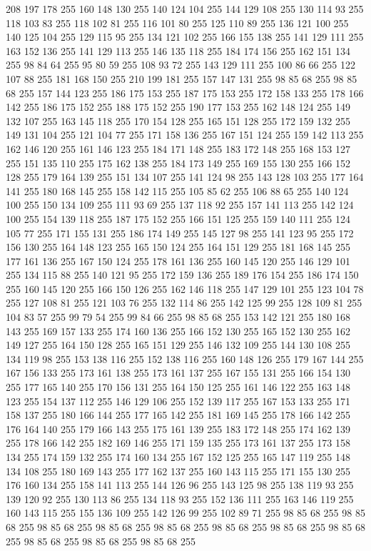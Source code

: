 208 197 178 255 160 148 130 255 140 124 104 255 144 129 108 255 130 114 93 255 118 103 83 255 118 102 81 255 116 101 80 255 125 110 89 255 136 121 100 255 140 125 104 255 129 115 95 255 134 121 102 255 166 155 138 255 141 129 111 255 163 152 136 255 141 129 113 255 146 135 118 255 184 174 156 255 162 151 134 255 98 84 64 255 95 80 59 255 108 93 72 255 143 129 111 255 100 86 66 255 122 107 88 255 181 168 150 255 210 199 181 255 157 147 131 255 98 85 68 255 98 85 68 255 157 144 123 255 186 175 153 255 187 175 153 255 172 158 133 255 178 166 142 255 186 175 152 255 188 175 152 255 190 177 153 255 162 148 124 255 149 132 107 255 163 145 118 255 170 154 128 255 165 151 128 255 172 159 132 255 149 131 104 255 121 104 77 255 171 158 136 255 167 151 124 255 159 142 113 255 162 146 120 255 161 146 123 255 184 171 148 255 183 172 148 255 168 153 127 255 151 135 110 255 175 162 138 255 184 173 149 255 169 155 130 255 166 152 128 255 179 164 139 255 151 134 107 255 141 124 98 255 143 128 103 255
177 164 141 255 180 168 145 255 158 142 115 255 105 85 62 255 106 88 65 255 140 124 100 255 150 134 109 255 111 93 69 255 137 118 92 255 157 141 113 255 142 124 100 255 154 139 118 255 187 175 152 255 166 151 125 255 159 140 111 255 124 105 77 255 171 155 131 255 186 174 149 255 145 127 98 255 141 123 95 255 172 156 130 255 164 148 123 255 165 150 124 255 164 151 129 255 181 168 145 255 177 161 136 255 167 150 124 255 178 161 136 255 160 145 120 255 146 129 101 255 134 115 88 255 140 121 95 255 172 159 136 255 189 176 154 255 186 174 150 255 160 145 120 255 166 150 126 255 162 146 118 255 147 129 101 255 123 104 78 255 127 108 81 255 121 103 76 255 132 114 86 255 142 125 99 255 128 109 81 255 104 83 57 255 99 79 54 255 99 84 66 255 98 85 68 255 153 142 121 255 180 168 143 255 169 157 133 255 174 160 136 255 166 152 130 255 165 152 130 255 162 149 127 255 164 150 128 255 165 151 129 255 146 132 109 255 144 130 108 255 134 119 98 255 153 138 116 255 152 138 116 255 160 148 126 255
179 167 144 255 167 156 133 255 173 161 138 255 173 161 137 255 167 155 131 255 166 154 130 255 177 165 140 255 170 156 131 255 164 150 125 255 161 146 122 255 163 148 123 255 154 137 112 255 146 129 106 255 152 139 117 255 167 153 133 255 171 158 137 255 180 166 144 255 177 165 142 255 181 169 145 255 178 166 142 255 176 164 140 255 179 166 143 255 175 161 139 255 183 172 148 255 174 162 139 255 178 166 142 255 182 169 146 255 171 159 135 255 173 161 137 255 173 158 134 255 174 159 132 255 174 160 134 255 167 152 125 255 165 147 119 255 148 134 108 255 180 169 143 255 177 162 137 255 160 143 115 255 171 155 130 255 176 160 134 255 158 141 113 255 144 126 96 255 143 125 98 255 138 119 93 255 139 120 92 255 130 113 86 255 134 118 93 255 152 136 111 255 163 146 119 255 160 143 115 255 155 136 109 255 142 126 99 255 102 89 71 255 98 85 68 255 98 85 68 255 98 85 68 255 98 85 68 255 98 85 68 255 98 85 68 255 98 85 68 255 98 85 68 255 98 85 68 255 98 85 68 255 98 85 68 255

